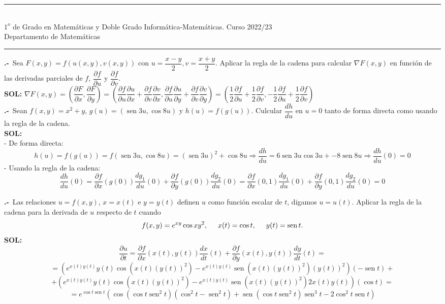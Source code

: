 \documentclass[11pt,a4paper]{article}
\date{22.03.2023}
\newcounter{ex}
\newcommand{\ejer}{\stepcounter{ex}\textbf{\theex.-}\ }
\newcommand{\sen}{\operatorname{sen}}
\begin{document}
\hrule \vskip 1mm

\\{\large \sc $1^o$ de Grado en Matem\'aticas y Doble Grado Inform\'atica-Matem\'aticas.} \hfill  Curso 2022/23\\{\large \sc Departamento de Matemáticas}


\vskip 1mm

 \vskip 1mm \hrule

\vskip 1mm
\raggedright

\ejer Sea $F(x,y)=f(u(x,y),v(x,y))$ con $u=\dfrac{x-y}{2},v=\dfrac{x+y}{2}$. Aplicar la regla de la cadena para calcular $\nabla F(x,y)$ en función de las derivadas parciales de $f$, $\dfrac{\partial f}{\partial u}$ y $\dfrac{\partial f}{\partial v}$.\\
\vskip 1mm
{\bf SOL:} $\nabla F(x,y)=\left(\dfrac{\partial F}{\partial x},\dfrac{\partial F}{\partial y}\right)=\left(\dfrac{\partial f}{\partial u}\dfrac{\partial u}{\partial x}+\dfrac{\partial f}{\partial v}\dfrac{\partial v}{\partial x}, \dfrac{\partial f}{\partial u}\dfrac{\partial u}{\partial y}+\dfrac{\partial f}{\partial v}\dfrac{\partial v}{\partial y} \right)=\left(\dfrac{1}{2}\dfrac{\partial f}{\partial u}+\dfrac{1}{2}\dfrac{\partial f}{\partial v}, -\dfrac{1}{2}\dfrac{\partial f}{\partial u}+\dfrac{1}{2}\dfrac{\partial f}{\partial v}\right)$\\

\ejer Sean $f(x,y)=x^2+y$, $g(u)=(\sen3u,\cos8u)$ y $h(u)=f(g(u))$. Culcular $\dfrac{dh}{du}$ en $u=0$ tanto de forma directa como usando la regla de la cadena.\\
\vskip 1mm
{\bf SOL:}\\
- De forma directa:
\[h(u)=f(g(u))=f(\sen3u,\cos8u)=(\sen3u)^2+\cos8u\Rightarrow \dfrac{dh}{du}=6\sen3u\cos3u+-8\sen8u\Rightarrow \dfrac{dh}{du}(0)=0\]
- Usando la regla de la cadena:
\[\dfrac{dh}{du}(0)=\dfrac{\partial f}{\partial x}(g(0))\dfrac{d g_1}{d u}(0)+\dfrac{\partial f}{\partial y}(g(0))\dfrac{d g_2}{d u}(0)=\dfrac{\partial f}{\partial x}(0,1)\dfrac{d g_1}{d u}(0)+\dfrac{\partial f}{\partial y}(0,1)\dfrac{d g_2}{d u}(0)=0\]

\ejer Las relaciones $u=f(x,y)$, $x=x(t)$ e $y=y(t)$ definen $u$ como función escalar de $t$, digamos $u=u(t)$. Aplicar la regla de la cadena para la derivada de $u$ respecto de $t$ cuando
\[f(x,y)=e^{xy}\cos xy^2, \hskip 5mm x(t)=\cos t, \hskip 5mm y(t)=\sen t. \]
\vskip 1mm
{\bf SOL:}
\[\dfrac{\partial u}{\partial t}=\dfrac{\partial f}{\partial x}(x(t),y(t))\dfrac{dx}{dt}(t)+\dfrac{\partial f}{\partial y}(x(t),y(t))\dfrac{dy}{dt}(t)=
\]
\[=\left(e^{x(t)y(t)}y(t)\cos(x(t)(y(t))^2)-e^{x(t)y(t)}\sen(x(t)(y(t))^2)(y(t))^2\right)(-\sen t)+
\]
\[+\left(e^{x(t)y(t)}y(t)\cos(x(t)(y(t))^2)-e^{x(t)y(t)}\sen(x(t)(y(t))^2)2x(t)y(t)\right)(\cos t)=   \]
\[=e^{\cos t\sen t}\left( \cos(\cos t\sen^2t)(\cos^2t-\sen^2t)+\sen(\cos t\sen^2t)\sen^3t-2\cos^2t\sen t\right)
\]
\end{document}
